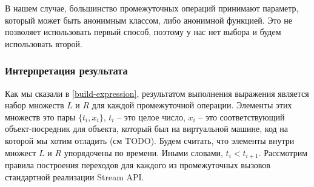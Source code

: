 В нашем случае, большинство промежуточных операций принимают параметр, который может быть анонимным классом, либо анонимной функцией. Это не позволяет использовать первый способ, поэтому у нас нет выбора и будем использовать второй.

\subsubsection{Интерпретация результата}\label{interpret}

Как мы сказали в \ref{build-expression}, результатом выполнения выражения является набор множеств $L$ и $R$ для каждой промежуточной операции. Элементы этих множеств это пары $\{t_i, x_i\}$, $t_i$ -- это целое число, $x_i$ -- это соответствующий объект-посредник для объекта, который был на виртуальной машине, код на которой мы хотим отладить (см TODO). Будем считать, что элементы внутри множест $L$ и $R$ упорядочены по времени. Иными словами, $t_i < t_{i + 1}$. Рассмотрим правила построения переходов для каждого из промежуточных вызовов стандартной реализации Stream API.
